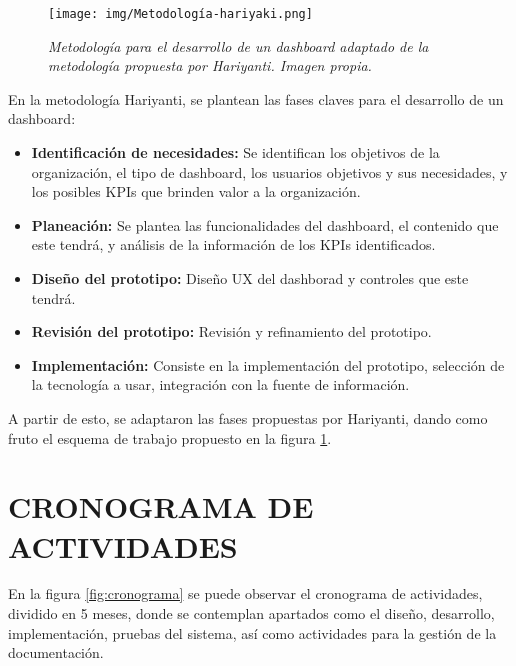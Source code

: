 \documentclass[spanish]{ieee_upb}
\begin{document}
\vspace{0.3cm}
\begin{figure}[htpb] 
	\centering
	\texttt{[image: img/Metodología-hariyaki.png]}
	\vspace{-1mm}
	\caption[adaptación de metodología propuesta por Hariyanti]{\textit{Metodología para el desarrollo de un dashboard adaptado de la metodología propuesta por Hariyanti\cite{hariyanti-dashboard}. Imagen propia.}}
	\label{fig:hariyanti} 
\end{figure}

En la metodología Hariyanti, se plantean las fases claves para el desarrollo de un dashboard:

\begin{itemize}
    \item \textbf{Identificación de necesidades: }Se identifican los objetivos de la organización, el tipo de dashboard, los usuarios objetivos y sus necesidades, y los posibles KPIs que brinden valor a la organización.
    \item \textbf{Planeación: }Se plantea las funcionalidades del dashboard, el contenido que este tendrá, y análisis de la información de los KPIs identificados.
    \item \textbf{Diseño del prototipo: }Diseño UX del dashborad y controles que este tendrá.
    \item \textbf{Revisión del prototipo: }Revisión y refinamiento del prototipo.
    \item \textbf{Implementación: }Consiste en la implementación del prototipo, selección de la tecnología a usar, integración con la fuente de información.
    
\end{itemize}

\vspace{0.3cm}
A partir de esto, se adaptaron las fases propuestas por Hariyanti, dando como fruto el esquema de trabajo propuesto en la figura \ref{fig:hariyanti}.



\newpage
\section{\label{sec:cronograma}CRONOGRAMA DE ACTIVIDADES}
En la figura \ref{fig:cronograma} se puede observar el cronograma de actividades, dividido en 5 meses, donde se contemplan apartados como el diseño, desarrollo, implementación, pruebas del sistema, así como actividades para la gestión de la documentación. 
\end{document}
